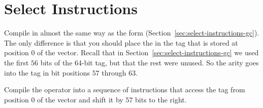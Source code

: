 \documentclass[11pt]{book}
\begin{document}
\section{Select Instructions}
\label{sec:select-instructions-R5}

Compile  in almost the
same way as the  form
(Section~\ref{sec:select-instructions-gc}). The only difference is
that you should place the  in the tag that is stored at
position $0$ of the vector. Recall that in
Section~\ref{sec:select-instructions-gc} we used the first $56$ bits
of the 64-bit tag, but that the rest were unused. So the arity goes
into the tag in bit positions $57$ through $63$.

Compile the  operator into a sequence of
instructions that access the tag from position $0$ of the vector and
shift it by $57$ bits to the right.
\end{document}
